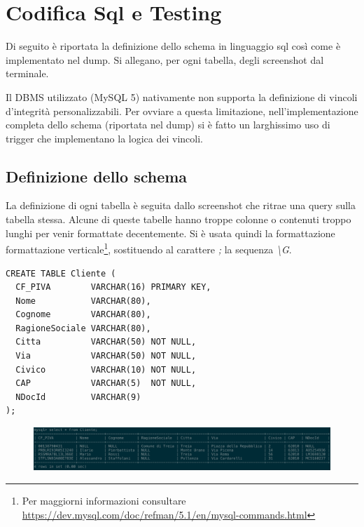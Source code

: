 \section{Codifica Sql e Testing} %
\label{sec:codifica_sql_e_testing}

Di seguito è riportata la definizione dello schema in linguaggio sql così come è implementato nel dump. Si allegano, per ogni tabella, degli screenshot dal terminale.

Il DBMS utilizzato (MySQL 5) nativamente non supporta la definizione di vincoli d'integrità personalizzabili. Per ovviare a questa limitazione, nell'implementazione completa dello schema (riportata nel dump) si è fatto un larghissimo uso di trigger che implementano la logica dei vincoli.

	\subsection{Definizione dello schema}
    La definizione di ogni tabella è seguita dallo screenshot che ritrae una query sulla tabella stessa. Alcune di queste tabelle hanno troppe colonne o contenuti troppo lunghi per venir formattate decentemente. Si è usata quindi la formattazione formattazione verticale\footnote{Per maggiorni informazioni consultare \url{https://dev.mysql.com/doc/refman/5.1/en/mysql-commands.html}}, sostituendo al carattere \emph{;} la sequenza \emph{\textbackslash G}.
		
    \begin{lstlisting}
CREATE TABLE Cliente (
  CF_PIVA        VARCHAR(16) PRIMARY KEY,
  Nome           VARCHAR(80),
  Cognome        VARCHAR(80),
  RagioneSociale VARCHAR(80),
  Citta          VARCHAR(50) NOT NULL,
  Via            VARCHAR(50) NOT NULL,
  Civico         VARCHAR(10) NOT NULL,
  CAP            VARCHAR(5)  NOT NULL,
  NDocId         VARCHAR(9)
);
    \end{lstlisting}
    \begin{figure}[H]
      \centering
      \includegraphics[width=15cm]{images/screenshots/schema/cliente.png}
    \end{figure}

